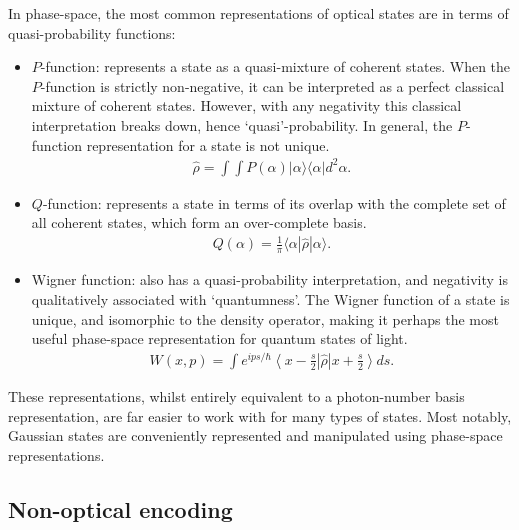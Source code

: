 \documentclass[aps, rmp, twocolumn, amsmath, amssymb, nofootinbib, superscriptaddress, longbibliography, floatfix, table-of-contents, eqsecnum]{revtex4-1}
\newcommand{\bra}[1]{\langle#1|}
\newcommand{\ket}[1]{|#1\rangle}
\begin{document}
In phase-space, the most common representations of optical states are in terms of quasi-probability functions:
\begin{itemize}
\item $P$-function: represents a state as a quasi-mixture of coherent states. When the $P$-function is strictly non-negative, it can be interpreted as a perfect classical mixture of coherent states. However, with any negativity this classical interpretation breaks down, hence `quasi'-probability. In general, the $P$-function representation for a state is not unique.
\begin{align}
\hat\rho = \int\!\!\!\int P(\alpha) \ket{\alpha}\bra{\alpha} d^2\alpha.
\end{align}
\item $Q$-function: represents a state in terms of its overlap with the complete set of all coherent states, which form an over-complete basis.
\begin{align}
Q(\alpha) = \frac{1}{\pi} \bra{\alpha}\hat\rho\ket{\alpha}.
\end{align}
\item Wigner function: also has a quasi-probability interpretation, and negativity is qualitatively associated with `quantumness'. The Wigner function of a state is unique, and isomorphic to the density operator, making it perhaps the most useful phase-space representation for quantum states of light.
\begin{align}
W(x,p) = \int e^{ips/\hbar} \left\langle{x-\frac{s}{2}}\right| \hat\rho \left|{x+\frac{s}{2}}\right\rangle ds.
\end{align}
\end{itemize}
These representations, whilst entirely equivalent to a photon-number basis representation, are far easier to work with for many types of states. Most notably, Gaussian states are conveniently represented and manipulated using phase-space representations.

%
%

\subsection{Non-optical encoding}
\end{document}
